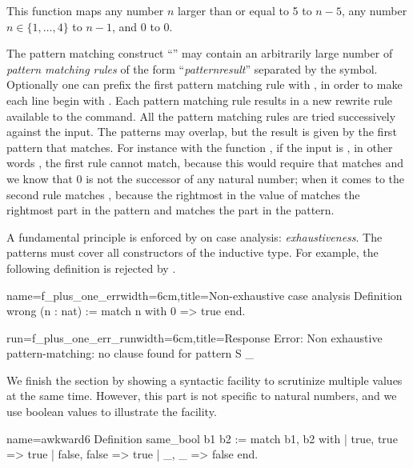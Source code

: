 This function maps any number \(n\) larger than or equal to 5 to \(n-5\),
any number \(n \in \{1, \ldots, 4\}\) to \(n-1\), and \(0\) to \(0\).

The pattern matching construct ``'' may contain an
arbitrarily large number of {\em pattern matching rules} of the form
``\emph{pattern}\C{ =>$~$}\emph{result}''
separated by the \C{|} symbol.  Optionally one can
prefix the first pattern matching rule with \C{|}, in order to make each line
begin with \C{|}. Each pattern matching rule results in a new rewrite
rule available to the  command.
All
the pattern matching rules are tried successively against the input.  The
patterns may overlap, but the result is given by the first pattern that
matches.
For instance with the function , if the input is
, in other words , the first
rule cannot match, because this would require that  matches
 and we know that \(0\) is not the successor of any
natural number; when it comes to the second rule  matches
, because the rightmost  in the value of  matches
the rightmost  part in the pattern and  matches the  part
in the pattern.

A fundamental principle is enforced by \Coq{} on case analysis:
\emph{exhaustiveness}.  The patterns must cover all constructors of
the inductive type.  For example, the following definition is
rejected by \Coq{}.

\begin{coq-left}{name=f_plus_one_err}{width=6cm,title=Non-exhaustive case analysis}
Definition wrong (n : nat) :=
  match n with 0 => true end.
$~$
\end{coq-left}
\begin{coqout-right}{run=f_plus_one_err_run}{width=6cm,title=Response}
Error: Non exhaustive pattern-matching:
no clause found for
pattern S _
\end{coqout-right}

We finish the section by showing a syntactic facility to scrutinize
multiple values at the same time.  However, this part is not specific to
natural numbers, and we use boolean values to illustrate the facility.

\begin{coq}{name=awkward6}{}
Definition same_bool b1 b2 :=
  match b1, b2 with
  | true, true => true
  | false, false => true
  | _, _ => false
  end.
\end{coq}

